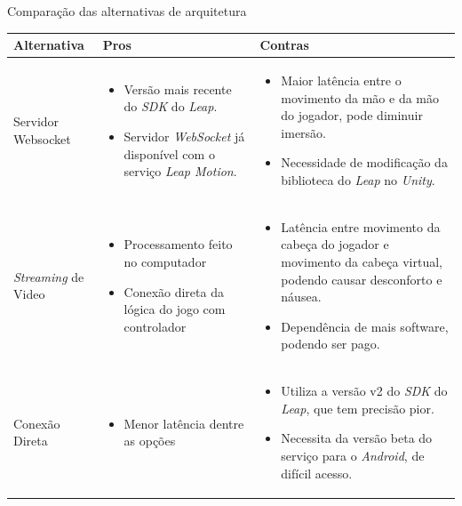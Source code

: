 \begin{quadro}[htb] \scriptsize
	\centering
	\caption[Comparação das alternativas de arquitetura]{Comparação das alternativas de arquitetura}
		
	\begin{tabular}{|>{\centering\arraybackslash}m{2.1cm}|>{\centering\arraybackslash}m{6cm}|>{\centering\arraybackslash}m{6cm}|}
		\hline 
		\textbf{Alternativa} & \textbf{Pros} & \textbf{Contras} \\
		\hline 
		Servidor Websocket
		&\begin{itemize}[label={},leftmargin=1mm]
			\item Versão mais recente do \textit{SDK} do \textit{Leap}.
			\item Servidor \textit{WebSocket} já disponível com o serviço \textit{Leap Motion}.
		\end{itemize}
		&\begin{itemize}[label={},leftmargin=1mm]
			\item Maior latência entre o movimento da mão e da mão do jogador, pode diminuir imersão.
			\item Necessidade de modificação da biblioteca do \textit{Leap} no \textit{Unity}.
		\end{itemize}
		\\ \hline 
		\textit{Streaming} de Video
		&\begin{itemize}[label={},leftmargin=1mm]
			\item Processamento feito no computador
			\item Conexão direta da lógica do jogo com controlador
		\end{itemize}
		&\begin{itemize}[label={},leftmargin=1mm]
			\item Latência entre movimento da cabeça do jogador e movimento da cabeça virtual, podendo causar desconforto e náusea.
			\item Dependência de mais software, podendo ser pago.
		\end{itemize}
	    \\ \hline 
		Conexão Direta
		&\begin{itemize}[label={},leftmargin=1mm]
				\item Menor latência dentre as opções
			\end{itemize}
		&\begin{itemize}[label={},leftmargin=1mm]
				\item Utiliza a versão v2 do \textit{SDK} do \textit{Leap}, que tem precisão pior.
				\item Necessita da versão beta do serviço para o \textit{Android}, de difícil acesso.
			\end{itemize}
		\\ 
		\hline 
	\end{tabular} 

	\legend{\fonteAP}
\label{tabela:alternativas-arquiteturas}
\end{quadro}

